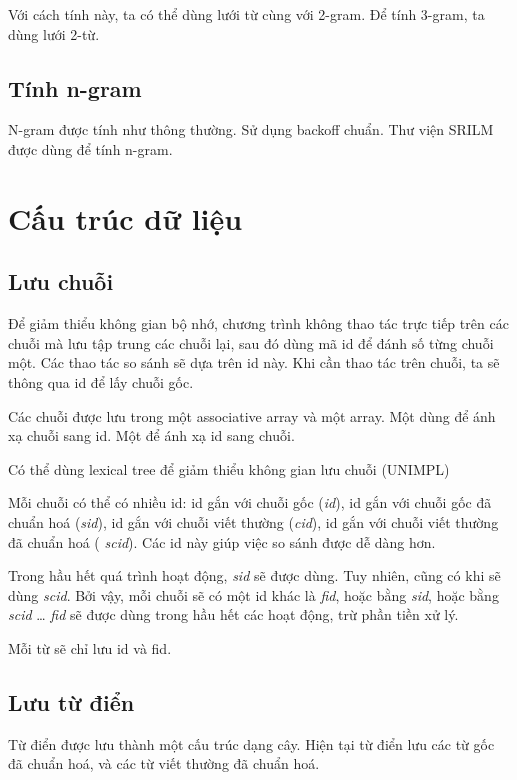 \documentclass[a4paper,oneside]{book} %
\begin{document}
Với cách tính này, ta có thể dùng lưới từ cùng với 2-gram. Để tính
3-gram, ta dùng lưới 2-từ. 

\subsection{Tính n-gram}

N-gram được tính như thông thường. Sử dụng backoff chuẩn. Thư viện
SRILM được dùng để tính n-gram.



\section{Cấu trúc dữ liệu}


\subsection{Lưu chuỗi}

Để giảm thiểu không gian bộ nhớ, chương trình không thao tác trực tiếp
trên các chuỗi mà lưu tập trung các chuỗi lại, sau đó dùng mã id để
đánh số từng chuỗi một. Các thao tác so sánh sẽ dựa trên id này. Khi
cần thao tác trên chuỗi, ta sẽ thông qua id để lấy chuỗi gốc.

Các chuỗi được lưu trong một associative array và một array. Một dùng
để ánh xạ chuỗi sang id. Một để ánh xạ id sang chuỗi.

Có thể dùng lexical tree để giảm thiểu không gian lưu chuỗi (UNIMPL)

Mỗi chuỗi có thể có nhiều id: id gắn với chuỗi gốc ({\em id}), id gắn
với chuỗi gốc đã chuẩn hoá ({\em sid}), id gắn với chuỗi viết thường
({\em cid}), id  gắn với chuỗi viết thường đã chuẩn hoá ({\em
  scid}). Các id này giúp việc so sánh được dễ dàng hơn. 

Trong hầu hết quá trình hoạt động, {\em sid} sẽ được dùng. Tuy nhiên,
cũng có khi sẽ dùng {\em scid}. Bởi vậy, mỗi chuỗi sẽ có một id khác
là {\em fid}, hoặc bằng {\em sid}, hoặc bằng {\em scid} \ldots{} {\em
  fid} sẽ được dùng trong hầu hết các hoạt động, trừ phần tiền xử lý.

Mỗi từ sẽ chỉ lưu id và fid.

\subsection{Lưu từ điển}

Từ điển được lưu thành một cấu trúc dạng cây. Hiện tại từ điển lưu các
từ gốc đã chuẩn hoá, và các từ viết thường đã chuẩn hoá.
\end{document}
